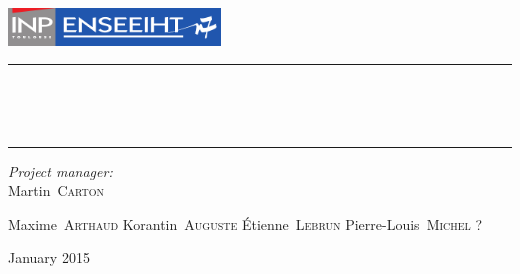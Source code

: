 \begin{titlepage}
  \begin{center}
    \includegraphics[height=1cm]{LogoEnseeiht}\\\vspace{1cm}
    \hrule\vspace{0.5cm}
    \textsc{\Large\thesubtitle}
    \\\vspace{0.5cm}

    \textbf{\huge\thetitle}
    \\\vspace{0.4cm}
    \hrule\vspace{2cm}

    \begin{minipage}{0.4\textwidth}
      \begin{flushleft} \large
        \emph{Project manager:}\\\hspace{1cm}Martin~\textsc{Carton}
      \end{flushleft}
    \end{minipage}
    \begin{minipage}{0.4\textwidth}
      \begin{flushright} \large
          Maxime~\textsc{Arthaud}
          Korantin~\textsc{Auguste}
          Étienne~\textsc{Lebrun}
          Pierre-Louis~\textsc{Michel ?} 
      \end{flushright}
    \end{minipage}

    \vfill
    {\large January 2015}
  \end{center}
\end{titlepage}
